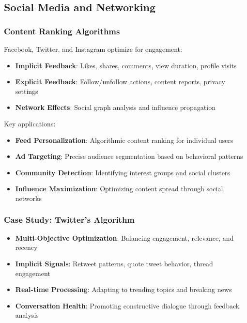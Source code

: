 \subsection{Social Media and Networking}

\subsubsection{Content Ranking Algorithms}

Facebook, Twitter, and Instagram optimize for engagement:

\begin{itemize}
    \item \textbf{Implicit Feedback}: Likes, shares, comments, view duration, profile visits
    \item \textbf{Explicit Feedback}: Follow/unfollow actions, content reports, privacy settings
    \item \textbf{Network Effects}: Social graph analysis and influence propagation
\end{itemize}

Key applications:
\begin{itemize}
    \item \textbf{Feed Personalization}: Algorithmic content ranking for individual users
    \item \textbf{Ad Targeting}: Precise audience segmentation based on behavioral patterns
    \item \textbf{Community Detection}: Identifying interest groups and social clusters
    \item \textbf{Influence Maximization}: Optimizing content spread through social networks
\end{itemize}

\subsubsection{Case Study: Twitter's Algorithm}

\begin{itemize}
    \item \textbf{Multi-Objective Optimization}: Balancing engagement, relevance, and recency
    \item \textbf{Implicit Signals}: Retweet patterns, quote tweet behavior, thread engagement
    \item \textbf{Real-time Processing}: Adapting to trending topics and breaking news
    \item \textbf{Conversation Health}: Promoting constructive dialogue through feedback analysis
\end{itemize}

